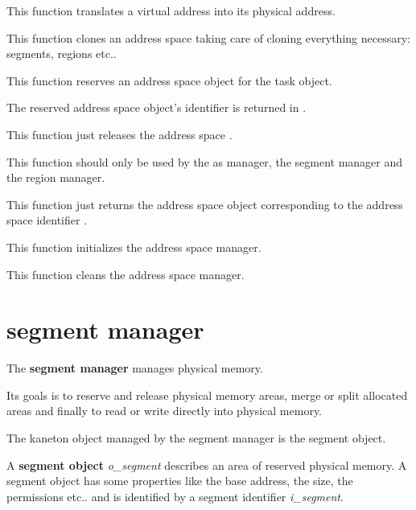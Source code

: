 	 {
	   This function translates a virtual address into its physical
	   address.
	 }

	 {
	   This function clones an address space taking care of cloning
	   everything necessary: segments, regions etc..
	 }

	 {
	   This function reserves an address space object for the
	   task  object.

	   The reserved address space object's identifier is returned
	   in .
	 }

	 {
	   This function just releases the address space .
	 }

	 {
	   This function should only be used by the as manager, the segment
	   manager and the region manager.

	   This function just returns the address space object
	   corresponding to the address space identifier .
	 }

	 {
	   This function initializes the address space manager.
	 }

	 {
	   This function cleans the address space manager.
	 }

%
%

\section{segment manager}

The \textbf{segment manager} manages physical memory.

Its goals is to reserve and release physical memory areas, merge or split
allocated areas and finally to read or write directly into physical memory.

The kaneton object managed by the segment manager is the segment object.

A \textbf{segment object} \textit{o\_segment} describes an area of reserved
physical memory. A segment object has some properties like the base
address, the size, the permissions etc.. and is identified by a
segment identifier \textit{i\_segment}.


